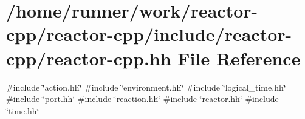 \hypertarget{reactor-cpp_8hh}{}\section{/home/runner/work/reactor-\/cpp/reactor-\/cpp/include/reactor-\/cpp/reactor-\/cpp.hh File Reference}
\label{reactor-cpp_8hh}
{\ttfamily \#include \char`\"{}action.\+hh\char`\"{}}\newline
{\ttfamily \#include \char`\"{}environment.\+hh\char`\"{}}\newline
{\ttfamily \#include \char`\"{}logical\+\_\+time.\+hh\char`\"{}}\newline
{\ttfamily \#include \char`\"{}port.\+hh\char`\"{}}\newline
{\ttfamily \#include \char`\"{}reaction.\+hh\char`\"{}}\newline
{\ttfamily \#include \char`\"{}reactor.\+hh\char`\"{}}\newline
{\ttfamily \#include \char`\"{}time.\+hh\char`\"{}}\newline
